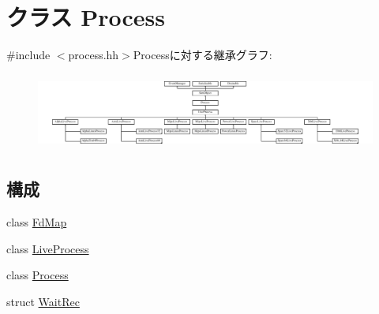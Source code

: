 \hypertarget{classProcess}{
\section{クラス Process}
\label{classProcess}
}


{\ttfamily \#include $<$process.hh$>$}Processに対する継承グラフ:\begin{figure}[H]
\begin{center}
\leavevmode
\includegraphics[height=2.58235cm]{classProcess}
\end{center}
\end{figure}
\subsection*{構成}
\begin{DoxyCompactItemize}
\item 
class \hyperlink{classProcess_1_1FdMap}{FdMap}
\item 
class \hyperlink{classProcess_1_1LiveProcess}{LiveProcess}
\item 
class \hyperlink{classProcess_1_1Process}{Process}
\item 
struct \hyperlink{structProcess_1_1WaitRec}{WaitRec}
\end{DoxyCompactItemize}
